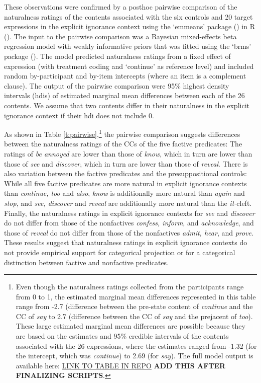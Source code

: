 \documentclass[11pt,fleqn]{article}
\newcommand{\6}{\mbox{$[\hspace*{-.6mm}[$}}
\newcommand{\9}{\mbox{$]\hspace*{-.6mm}]$}}
\begin{document}
These observations were confirmed by a posthoc pairwise comparison of the naturalness ratings of the contents associated with the six controls and 20 target expressions in the explicit ignorance context using the `emmeans' package (\citealt{emmeans}) in R (\citealt{r}). The input to the pairwise comparison was a Bayesian mixed-effects beta regression model with weakly informative priors that was fitted using the `brms' package (\citealt{buerkner2017}). The model predicted naturalness ratings from a fixed effect of expression (with treatment coding and `continue' as reference level) and included random by-participant and by-item intercepts (where an item is a complement clause). The output of the pairwise comparison were 95\% highest density intervals (hdis) of estimated marginal mean differences between each of the 26 contents. We assume that two contents differ in their naturalness in the explicit ignorance context if their hdi does not include 0.

As shown in Table \ref{t:pairwise},\footnote{Even though the naturalness ratings collected from the participants range from 0 to 1, the estimated marginal mean differences represented in this table range from -2.7 (difference between the pre-state content of {\em continue} and the CC of {\em say} to 2.7 (difference between the CC of {\em say} and the prejacent of {\em too}). These large estimated marginal mean differences are possible because they are based on the estimates and 95\% credible intervals of the  contents associated with the 26 expressions, where the estimates ranged from -1.32 (for the intercept, which was {\em continue}) to 2.69 (for {\em say}). The full model output is available here: \url{LINK TO TABLE IN REPO} {\bf ADD THIS AFTER FINALIZING SCRIPTS}.} the pairwise comparison suggests differences between the naturalness ratings of the CCs of the five factive predicates: The ratings of {\em be annoyed} are lower than those of {\em know}, which in turn are lower than those of {\em see} and {\em discover}, which in turn are lower than those of {\em reveal}. There is also variation between the factive predicates and the presuppositional controls: While all five factive predicates are more natural in explicit ignorance contexts than {\em continue, too} and {\em also}, {\em know} is additionally more natural than {\em again} and {\em stop}, and {\em see, discover} and {\em reveal} are additionally more natural than the {\em it-}cleft. Finally, the naturalness ratings in explicit ignorance contexts for {\em see} and {\em discover} do not differ from those of the nonfactives {\em confess, inform}, and {\em acknowledge}, and those of {\em reveal} do not differ from those of the nonfactives {\em admit, hear}, and {\em prove}. These results suggest that naturalness ratings in explicit ignorance contexts do not provide empirical support for categorical projection or for a categorical distinction between factive and nonfactive predicates. 
\end{document}
